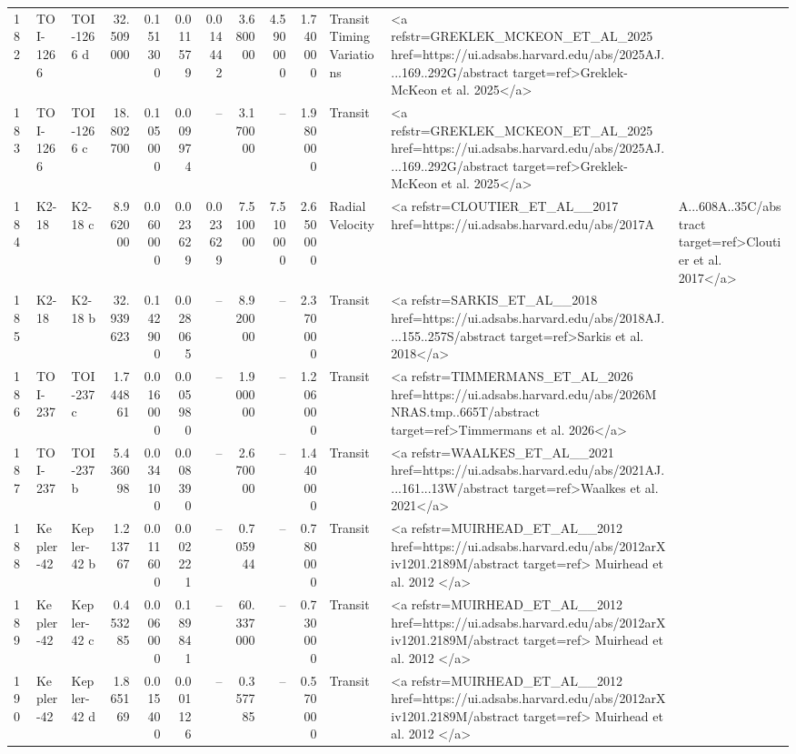 \begin{tabular}{lllrrrrrrrll}
182 & TOI-1266 & TOI-1266 d & 32.509000 & 0.151300 & 0.011579 & 0.014442 & 3.680000 & 4.590000 & 1.740000 & Transit Timing Variations & <a refstr=GREKLEK_MCKEON_ET_AL_2025 href=https://ui.adsabs.harvard.edu/abs/2025AJ....169..292G/abstract target=ref>Greklek-McKeon et al. 2025</a> \\
183 & TOI-1266 & TOI-1266 c & 18.802700 & 0.105000 & 0.009974 & -- & 3.170000 & -- & 1.980000 & Transit & <a refstr=GREKLEK_MCKEON_ET_AL_2025 href=https://ui.adsabs.harvard.edu/abs/2025AJ....169..292G/abstract target=ref>Greklek-McKeon et al. 2025</a> \\
184 & K2-18 & K2-18 c & 8.962000 & 0.060000 & 0.023629 & 0.023629 & 7.510000 & 7.510000 & 2.650000 & Radial Velocity & <a refstr=CLOUTIER_ET_AL__2017 href=https://ui.adsabs.harvard.edu/abs/2017A&A...608A..35C/abstract target=ref>Cloutier et al. 2017</a> \\
185 & K2-18 & K2-18 b & 32.939623 & 0.142900 & 0.028065 & -- & 8.920000 & -- & 2.370000 & Transit & <a refstr=SARKIS_ET_AL__2018 href=https://ui.adsabs.harvard.edu/abs/2018AJ....155..257S/abstract target=ref>Sarkis et al. 2018</a> \\
186 & TOI-237 & TOI-237 c & 1.744861 & 0.016000 & 0.005980 & -- & 1.900000 & -- & 1.206000 & Transit & <a refstr=TIMMERMANS_ET_AL_2026 href=https://ui.adsabs.harvard.edu/abs/2026MNRAS.tmp..665T/abstract target=ref>Timmermans et al. 2026</a> \\
187 & TOI-237 & TOI-237 b & 5.436098 & 0.034100 & 0.008390 & -- & 2.670000 & -- & 1.440000 & Transit & <a refstr=WAALKES_ET_AL__2021 href=https://ui.adsabs.harvard.edu/abs/2021AJ....161...13W/abstract target=ref>Waalkes et al. 2021</a> \\
188 & Kepler-42 & Kepler-42 b & 1.213767 & 0.011600 & 0.002221 & -- & 0.705944 & -- & 0.780000 & Transit & <a refstr=MUIRHEAD_ET_AL__2012 href=https://ui.adsabs.harvard.edu/abs/2012arXiv1201.2189M/abstract target=ref> Muirhead et al. 2012 </a> \\
189 & Kepler-42 & Kepler-42 c & 0.453285 & 0.006000 & 0.189841 & -- & 60.337000 & -- & 0.730000 & Transit & <a refstr=MUIRHEAD_ET_AL__2012 href=https://ui.adsabs.harvard.edu/abs/2012arXiv1201.2189M/abstract target=ref> Muirhead et al. 2012 </a> \\
190 & Kepler-42 & Kepler-42 d & 1.865169 & 0.015400 & 0.001126 & -- & 0.357785 & -- & 0.570000 & Transit & <a refstr=MUIRHEAD_ET_AL__2012 href=https://ui.adsabs.harvard.edu/abs/2012arXiv1201.2189M/abstract target=ref> Muirhead et al. 2012 </a> \\

\end{tabular}
